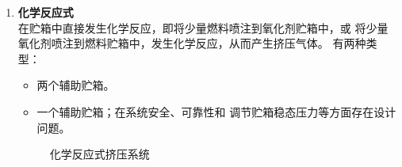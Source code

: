 \begin{enumerate}[\hspace*{1.5em} (1) ]
	\item \textbf{化学反应式}\\
	在贮箱中直接发生化学反应，即将少量燃料喷注到氧化剂贮箱中，或
将少量氧化剂喷注到燃料贮箱中，发生化学反应，从而产生挤压气体。
有两种类型：
	\vspace*{-0.5em}
	\begin{itemize}
		\item \blue[双直接喷注式]\quad 两个辅助贮箱。
		\item \blue[串联直接喷注式]\quad 一个辅助贮箱；在系统安全、可靠性和 调节贮箱稳态压力等方面存在设计问题。
	\end{itemize}
	\begin{figure}[!htb]
		\centering
	\caption{化学反应式挤压系统}
	\vspace*{-2em}
	\end{figure}
\end{enumerate}

